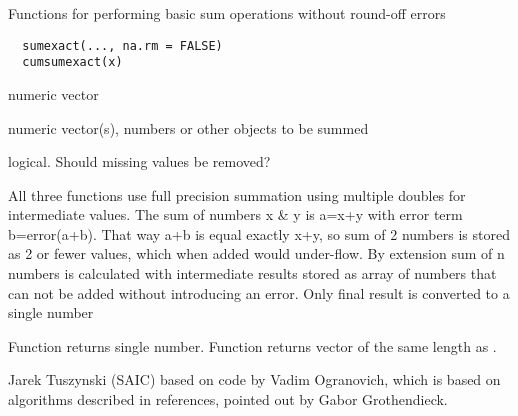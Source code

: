 \begin{Description}\relax
Functions for performing basic sum operations without round-off errors
\end{Description}
\begin{Usage}
\begin{verbatim}
  sumexact(..., na.rm = FALSE)
  cumsumexact(x)
\end{verbatim}
\end{Usage}
\begin{Arguments}
\begin{ldescription}
\item[\code{x}] numeric vector
\item[\code{...}] numeric vector(s), numbers or other objects to be summed
\item[\code{na.rm}] logical. Should missing values be removed?
\end{ldescription}
\end{Arguments}
\begin{Details}\relax
All three functions use full precision summation using multiple doubles for 
intermediate values. The sum of numbers x \& y is a=x+y with error term 
b=error(a+b). That way a+b is equal exactly x+y, so sum of 2 numbers is stored
as 2 or fewer values, which when added would under-flow. By extension sum of n 
numbers is calculated with intermediate results stored as array of numbers 
that can not be added without introducing an error. Only final result is 
converted to a single number
\end{Details}
\begin{Value}
Function  returns single number. Function  
returns vector of the same length as .
\end{Value}
\begin{Author}\relax
Jarek Tuszynski (SAIC)  based on
code by Vadim Ogranovich, which is based on algorithms described in 
references, pointed out by Gabor Grothendieck.
\end{Author}
